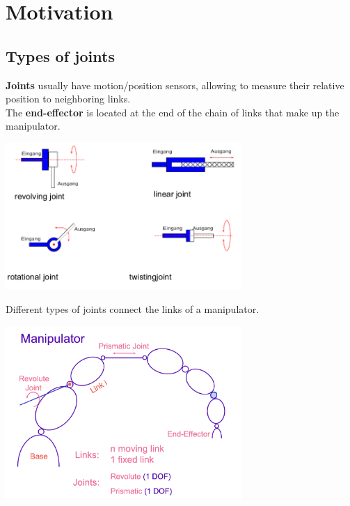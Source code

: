 \section{Motivation}
\subsection{Types of joints}
\textbf{Joints} usually have motion/position sensors, allowing to measure their relative position to neighboring links.\\
The \textbf{end-effector} is located at the end of the chain of links that make up the manipulator.

\begin{center}
    \includegraphics[width=9cm]{sections/imgs/1.png}
\end{center}

Different types of joints connect the links of a manipulator.

\begin{center}
	\includegraphics[width=9cm]{sections/imgs/1_manipulator.png}
\end{center}
